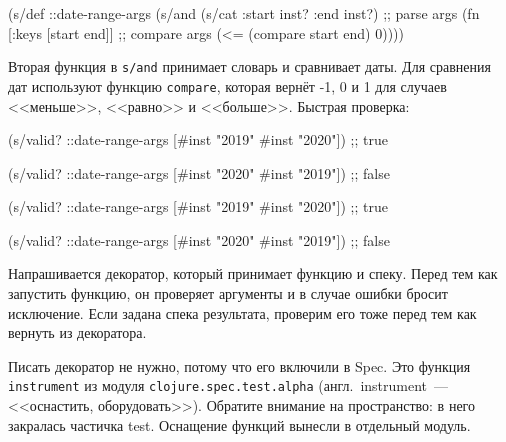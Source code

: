 \else

\begin{english}
  \begin{clojure}
(s/def ::date-range-args
  (s/and
   (s/cat :start inst? :end inst?) ;; parse args
   (fn [{:keys [start end]}]       ;; compare args
     (<= (compare start end) 0))))
  \end{clojure}
\end{english}

\fi


Вторая функция в \verb|s/and| принимает словарь и сравнивает даты. Для сравнения
дат используют функцию \verb|compare|, которая вернёт \mbox{-1}, 0 и 1 для
случаев <<меньше>>, <<равно>> и <<больше>>. Быстрая проверка:

\ifx\DEVICETYPE\MOBILE

\begin{english}
  \begin{clojure}
(s/valid? ::date-range-args
          [#inst "2019" #inst "2020"])
;; true

(s/valid? ::date-range-args
          [#inst "2020" #inst "2019"])
;; false
  \end{clojure}
\end{english}

\else

\begin{english}
  \begin{clojure}
(s/valid? ::date-range-args
          [#inst "2019" #inst "2020"]) ;; true

(s/valid? ::date-range-args
          [#inst "2020" #inst "2019"]) ;; false
  \end{clojure}
\end{english}

\fi


Напрашивается декоратор, который принимает функцию и спеку. Перед тем как
запустить функцию, он проверяет аргументы и в случае ошибки бросит исключение.
Если задана спека результата, проверим его тоже перед тем как вернуть из
декоратора.


Писать декоратор не нужно, потому что его включили в Spec. Это функция
\verb|instrument| из модуля \verb|clojure.spec.test.alpha|
(англ.~instru\-ment~--- <<оснастить, оборудовать>>). Обратите внимание на
пространство: в него закралась частичка test. Оснащение функций вынесли в
отдельный модуль.

